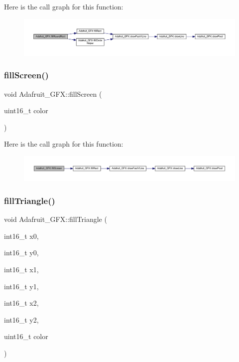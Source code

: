 Here is the call graph for this function\+:\nopagebreak
\begin{figure}[H]
\begin{center}
\leavevmode
\includegraphics[width=350pt]{class_adafruit___g_f_x_a78dc59f6a508bcd3d5ac7af957b8b1ac_cgraph}
\end{center}
\end{figure}
\mbox{\label{class_adafruit___g_f_x_a2b2730aaf2208990928f9c0f85558527}} 
\subsubsection{\texorpdfstring{fill\+Screen()}{fillScreen()}}
{\footnotesize\ttfamily void Adafruit\+\_\+\+G\+F\+X\+::fill\+Screen (\begin{DoxyParamCaption}\item[{uint16\+\_\+t}]{color }\end{DoxyParamCaption})}

Here is the call graph for this function\+:\nopagebreak
\begin{figure}[H]
\begin{center}
\leavevmode
\includegraphics[width=350pt]{class_adafruit___g_f_x_a2b2730aaf2208990928f9c0f85558527_cgraph}
\end{center}
\end{figure}
\mbox{\label{class_adafruit___g_f_x_a4cd646a3d9c9d5b3ee50010d0aa387cd}} 
\subsubsection{\texorpdfstring{fill\+Triangle()}{fillTriangle()}}
{\footnotesize\ttfamily void Adafruit\+\_\+\+G\+F\+X\+::fill\+Triangle (\begin{DoxyParamCaption}\item[{int16\+\_\+t}]{x0,  }\item[{int16\+\_\+t}]{y0,  }\item[{int16\+\_\+t}]{x1,  }\item[{int16\+\_\+t}]{y1,  }\item[{int16\+\_\+t}]{x2,  }\item[{int16\+\_\+t}]{y2,  }\item[{uint16\+\_\+t}]{color }\end{DoxyParamCaption})}


